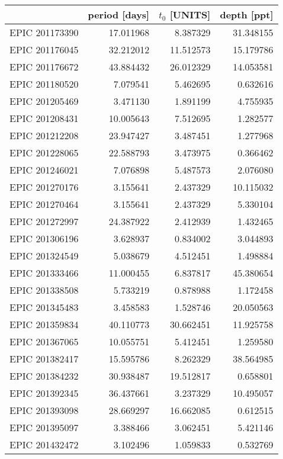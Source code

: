 \begin{tabular}{lrrr}
\toprule
                &  period [days] & $t_0$ [UNITS] & depth [ppt] \\
\midrule
 EPIC 201173390 &  17.011968 &   8.387329 &  31.348155 \\
 EPIC 201176045 &  32.212012 &  11.512573 &  15.179786 \\
 EPIC 201176672 &  43.884432 &  26.012329 &  14.053581 \\
 EPIC 201180520 &   7.079541 &   5.462695 &   0.632616 \\
 EPIC 201205469 &   3.471130 &   1.891199 &   4.755935 \\
 EPIC 201208431 &  10.005643 &   7.512695 &   1.282577 \\
 EPIC 201212208 &  23.947427 &   3.487451 &   1.277968 \\
 EPIC 201228065 &  22.588793 &   3.473975 &   0.366462 \\
 EPIC 201246021 &   7.076898 &   5.487573 &   2.076080 \\
 EPIC 201270176 &   3.155641 &   2.437329 &  10.115032 \\
 EPIC 201270464 &   3.155641 &   2.437329 &   5.330104 \\
 EPIC 201272997 &  24.387922 &   2.412939 &   1.432465 \\
 EPIC 201306196 &   3.628937 &   0.834002 &   3.044893 \\
 EPIC 201324549 &   5.038679 &   4.512451 &   1.498884 \\
 EPIC 201333466 &  11.000455 &   6.837817 &  45.380654 \\
 EPIC 201338508 &   5.733219 &   0.878988 &   1.172458 \\
 EPIC 201345483 &   3.458583 &   1.528746 &  20.050563 \\
 EPIC 201359834 &  40.110773 &  30.662451 &  11.925758 \\
 EPIC 201367065 &  10.055751 &   5.412451 &   1.259580 \\
 EPIC 201382417 &  15.595786 &   8.262329 &  38.564985 \\
 EPIC 201384232 &  30.938487 &  19.512817 &   0.658801 \\
 EPIC 201392345 &  36.437661 &   3.237329 &  10.495057 \\
 EPIC 201393098 &  28.669297 &  16.662085 &   0.612515 \\
 EPIC 201395097 &   3.388466 &   3.062451 &   5.421146 \\
 EPIC 201432472 &   3.102496 &   1.059833 &   0.532769 \\

\end{tabular}

